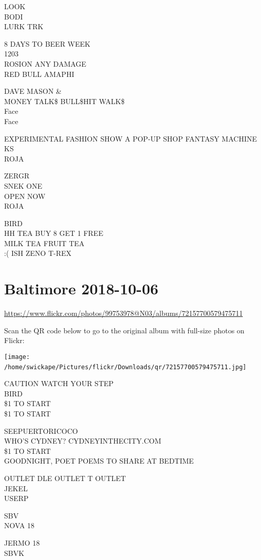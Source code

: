 \documentclass[10pt,letterpaper]{article}
\begin{document}
LOOK\\
BODI\\
LURK TRK

8 DAYS TO BEER WEEK\\
1203\\
ROSION ANY DAMAGE\\
RED BULL AMAPHI

DAVE MASON \&\\
MONEY TALK\$ BULL\$HIT WALK\$\\
Face\\
Face

EXPERIMENTAL FASHION SHOW A POP{-}UP SHOP FANTASY MACHINE\\
KS\\
ROJA

ZERGR\\
SNEK ONE\\
OPEN NOW\\
ROJA

BIRD\\
HH TEA BUY 8 GET 1 FREE\\
MILK TEA FRUIT TEA\\
:( ISH ZENO T{-}REX
\

\section*{Baltimore 2018-10-06}

\url{https://www.flickr.com/photos/99753978@N03/albums/72157700579475711}

Scan the QR code below to go to the original album with full-size photos on Flickr:

\texttt{[image: /home/swickape/Pictures/flickr/Downloads/qr/72157700579475711.jpg]}
\

CAUTION WATCH YOUR STEP\\
BIRD\\
\$1 TO START\\
\$1 TO START

SEEPUERTORICOCO\\
WHO'S CYDNEY?  CYDNEYINTHECITY.COM\\
\$1 TO START\\
GOODNIGHT, POET POEMS TO SHARE AT BEDTIME

OUTLET DLE OUTLET T OUTLET\\
JEKEL\\
USERP

SBV\\
NOVA 18

JERMO 18\\
SBVK
\end{document}

